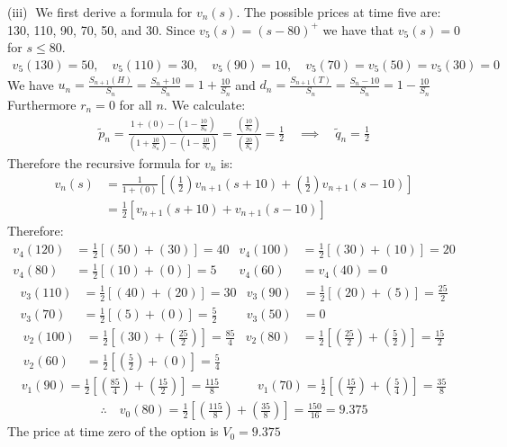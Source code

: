 \documentclass[12pt, letterpaper]{article}
\begin{document}
\vspace{5mm}
\noindent
(iii)$\;$ We first derive a formula for $v_n(s)$.
The possible prices at time five are: 130, 110, 90, 70, 50, and 30.
Since $v_5(s) = (s-80)^+$ we have that $v_5(s) = 0$ for $s \leq 80$.
\begin{gather*}
    v_5(130) = 50, \quad v_5(110) = 30, \quad v_5(90)=10, \quad
    v_5(70)=v_5(50)=v_5(30) =0
\end{gather*}
We have $u_n = \frac{S_{n+1}(H)}{S_n} = \frac{S_n+10}{S_n} = 1 + \frac{10}{S_n}$ and $d_n =\frac{S_{n+1}(T)}{S_n} = \frac{S_n-10}{S_n} = 1 - \frac{10}{S_n}$
Furthermore $r_n=0$ for all $n$.
We calculate:
\begin{gather*}
    \tilde p_n = \frac{ 1 + (0) - \left( 1 - \frac{10}{S_n}\right)}{\left( 1 + \frac{10}{S_n}\right) - \left( 1 - \frac{10}{S_n}\right)} = \frac{\left( \frac{10}{S_n}\right)}{\left( \frac{20}{S_n}\right)} = \frac{1}{2} \quad \implies \quad \tilde q_n = \frac{1}{2}
\end{gather*}
Therefore the recursive formula for $v_n$ is:
\begin{align*}
    v_n(s) &= \frac{1}{1+(0)}\left[\left( \tfrac{1}{2}\right) v_{n+1}(s+10) + \left(\tfrac{1}{2}\right) v_{n+1}(s-10) \right] \\
    &= \tfrac{1}{2}\left[v_{n+1}(s+10) + v_{n+1}(s-10) \right]
\end{align*}
Therefore:
\begin{align*}
    v_4(120) &= \tfrac{1}{2}\left[ (50) + (30) \right] = 40 &
    v_4(100) &= \tfrac{1}{2}\left[ (30) + (10) \right] = 20 \\
    v_4(80) &= \tfrac{1}{2}\left[ (10) + (0) \right] = 5 &
    v_4(60) &= v_4(40) = 0
\end{align*}
\begin{align*}
    v_3(110) &= \tfrac{1}{2}\left[ (40) + (20) \right] = 30 &
    v_3(90) &= \tfrac{1}{2}\left[ (20) + (5) \right] = \tfrac{25}{2} \\
    v_3(70) &= \tfrac{1}{2}\left[ (5) + (0) \right] = \tfrac{5}{2} &
    v_3(50) &= 0
\end{align*}
\begin{align*}
    v_2(100) &= \tfrac{1}{2}\left[ (30) + \left( \tfrac{25}{2} \right) \right] = \tfrac{85}{4} &
    v_2(80) &= \tfrac{1}{2}\left[ \left( \tfrac{25}{2} \right) + \left( \tfrac{5}{2} \right) \right] = \tfrac{15}{2} \\
    v_2(60) &= \tfrac{1}{2}\left[ \left( \tfrac{5}{2} \right) + \left( 0 \right) \right] = \tfrac{5}{4} 
\end{align*}
\begin{align*}
    v_1(90) = \tfrac{1}{2}\left[ \left( \tfrac{85}{4} \right) + \left( \tfrac{15}{2} \right) \right] = \tfrac{115}{8} \quad\quad\quad
    v_1(70) = \tfrac{1}{2}\left[ \left( \tfrac{15}{2} \right) + \left( \tfrac{5}{4} \right) \right] = \tfrac{35}{8}
\end{align*}
\begin{gather*}
    \therefore \quad v_0(80) = \tfrac{1}{2}\left[ \left( \tfrac{115}{8} \right) + \left( \tfrac{35}{8} \right) \right] = \tfrac{150}{16} = 9.375
\end{gather*}
The price at time zero of the option is $V_0 = 9.375$

\rightline{$\square$}
\end{document}
